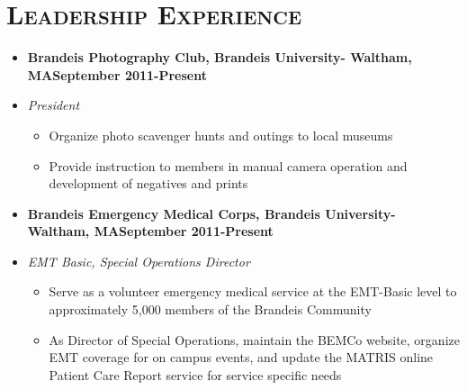 \documentclass[11pt, oneside]{article}
\newcommand{\lr}[2]{#1\hfill#2}
\newenvironment{ressection}[1]{
  \section{\normalsize \scshape \selectfont #1 \normalfont}
  \vspace{-4pt}
  \begin{itemize} \itemsep-2pt
}{
  \end{itemize}
  \vspace{-20pt}
}
\newenvironment{resitem}[4]{
\item[] \lr{\bfseries \selectfont #1\normalfont, #2} {#3}
\item[] \textsl{#4}
  \vspace{-4pt}
  \begin{itemize} \itemsep-2pt
}{
  \end{itemize}
}
\begin{document}
\begin{ressection}{Leadership Experience}
  \begin{resitem}{Brandeis Photography Club}{Brandeis University- Waltham, MA}{September 2011-Present}{President}
  \item Organize photo scavenger hunts and outings to local museums
  \item Provide instruction to members in manual camera operation and development of negatives and prints
  \end{resitem}
  \begin{resitem}{Brandeis Emergency Medical Corps}{Brandeis University- Waltham, MA}{September 2011-Present}{EMT Basic, Special Operations Director}
  \item Serve as a volunteer emergency medical service at the EMT-Basic level to approximately 5,000 members of the Brandeis Community
  \item As Director of Special Operations, maintain the BEMCo website, organize EMT coverage for on campus events, and update the MATRIS online Patient Care Report service for service specific needs
  \end{resitem}
  \end{ressection}
\end{document}
